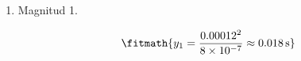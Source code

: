 \begin{enumerate}

\item Magnitud 1.

\[\fitmath{y_{1}=\frac{{0.00012}^{2}}{8\times10^{-7}}\approx 0.018\,\mathrm{s}}\]

\end{enumerate}
